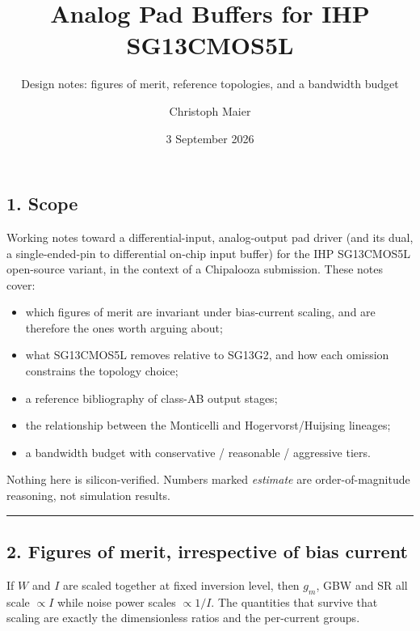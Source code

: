 \documentclass[
  10pt,
  a4paper,
]{article}
\title{Analog Pad Buffers for IHP SG13CMOS5L}
\subtitle{Design notes: figures of merit, reference topologies, and a bandwidth budget}
\author{Christoph Maier}
\date{3 September 2026}
\providecommand{\tightlist}{%
  \setlength{\itemsep}{0pt}\setlength{\parskip}{0pt}}
\begin{document}
\maketitle

{
\hypersetup{linkcolor=DarkSlateGray}
\setcounter{tocdepth}{2}
\tableofcontents
}
\hypertarget{scope}{%
\subsection{1. Scope}\label{scope}}

Working notes toward a differential-input, analog-output pad driver (and
its dual, a single-ended-pin to differential on-chip input buffer) for
the IHP SG13CMOS5L open-source variant, in the context of a Chipalooza
submission. These notes cover:

\begin{itemize}
\tightlist
\item
  which figures of merit are invariant under bias-current scaling, and
  are therefore the ones worth arguing about;
\item
  what SG13CMOS5L removes relative to SG13G2, and how each omission
  constrains the topology choice;
\item
  a reference bibliography of class-AB output stages;
\item
  the relationship between the Monticelli and Hogervorst/Huijsing
  lineages;
\item
  a bandwidth budget with conservative / reasonable / aggressive tiers.
\end{itemize}

Nothing here is silicon-verified. Numbers marked \emph{estimate} are
order-of-magnitude reasoning, not simulation results.

\begin{center}\rule{0.5\linewidth}{0.5pt}\end{center}

\hypertarget{figures-of-merit-irrespective-of-bias-current}{%
\subsection{2. Figures of merit, irrespective of bias
current}\label{figures-of-merit-irrespective-of-bias-current}}

If \(W\) and \(I\) are scaled together at fixed inversion level, then
\(g_m\), GBW and SR all scale \(\propto I\) while noise power scales
\(\propto 1/I\). The quantities that survive that scaling are exactly
the dimensionless ratios and the per-current groups.
\end{document}
